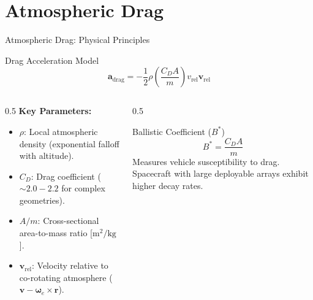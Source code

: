 \documentclass[aspectratio=169,11pt]{beamer}
\begin{document}
\section{Atmospheric Drag}

\begin{frame}{Atmospheric Drag: Physical Principles}
    \begin{block}{Drag Acceleration Model}
        $$\mathbf{a}_{\text{drag}} = -\frac{1}{2} \rho \left(\frac{C_D A}{m}\right) v_{\text{rel}} \mathbf{v}_{\text{rel}}$$
    \end{block}

    \begin{columns}
        \begin{column}{0.5\textwidth}
            \textbf{Key Parameters:}
            \begin{itemize}
                \item $\rho$: Local atmospheric density (exponential falloff with altitude).
                \item $C_D$: Drag coefficient ($\sim 2.0 - 2.2$ for complex geometries).
                \item $A/m$: Cross-sectional area-to-mass ratio [$\text{m}^2/\text{kg}$].
                \item $\mathbf{v}_{\text{rel}}$: Velocity relative to co-rotating atmosphere ($\mathbf{v} - \boldsymbol{\omega}_e \times \mathbf{r}$).
            \end{itemize}
        \end{column}

        \begin{column}{0.5\textwidth}
            \begin{block}{Ballistic Coefficient ($B^*$)}
                $$B^* = \frac{C_D A}{m}$$
                Measures vehicle susceptibility to drag. Spacecraft with large deployable arrays exhibit higher decay rates.
            \end{block}
        \end{column}
    \end{columns}
\end{frame}
\end{document}
